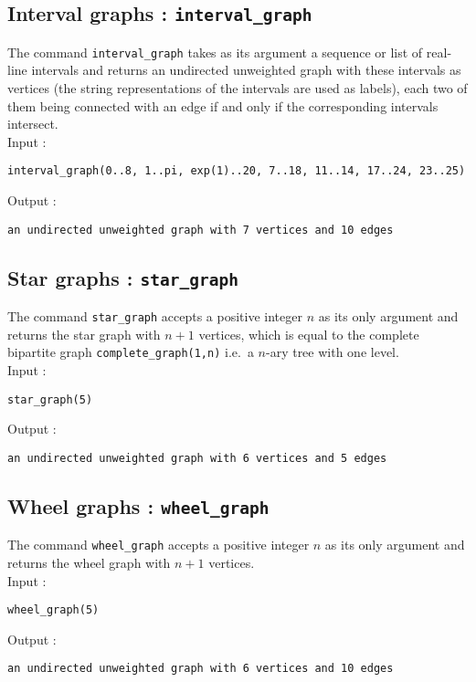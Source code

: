 \documentclass[a4paper,11pt]{article}
\begin{document}
\subsection{Interval graphs : {\tt interval\_graph}}

The command {\tt interval\_graph} takes as its argument a sequence or list of real-line intervals and returns an undirected unweighted graph with these intervals as vertices (the string representations of the intervals are used as labels), each two of them being connected with an edge if and only if the corresponding intervals intersect.\\
Input :
\begin{center}
  \tt interval\_graph(0..8, 1..pi, exp(1)..20, 7..18, 11..14, 17..24, 23..25)
\end{center}
Output :
\begin{center}
  \tt an undirected unweighted graph with 7 vertices and 10 edges
\end{center}

\subsection{Star graphs : {\tt star\_graph}}

The command {\tt star\_graph} accepts a positive integer $ n $ as its only argument and returns the star graph with $ n+1 $ vertices, which is equal to the complete bipartite graph {\tt complete\_graph(1,n)} i.e.~a $ n $-ary tree with one level.\\
Input :
\begin{center}
  \tt star\_graph(5)
\end{center}
Output :
\begin{center}
  \tt an undirected unweighted graph with 6 vertices and 5 edges
\end{center}

\subsection{Wheel graphs : {\tt wheel\_graph}}

The command {\tt wheel\_graph} accepts a positive integer $ n $ as its only argument and returns the wheel graph with $ n+1 $ vertices.\\
Input :
\begin{center}
  \tt wheel\_graph(5)
\end{center}
Output :
\begin{center}
  \tt an undirected unweighted graph with 6 vertices and 10 edges
\end{center}
\end{document}
